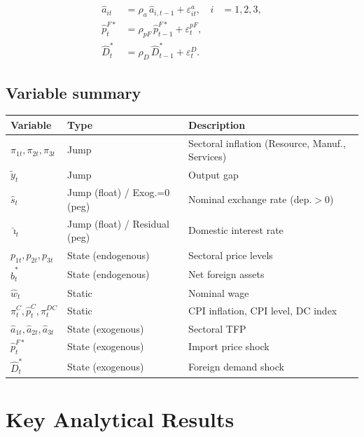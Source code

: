 \documentclass[11pt,a4paper]{article}
\newcommand{\wh}[1]{\widehat{#1}}
\providecommand{\tl}[1]{\widetilde{#1}}
\newcommand{\DC}{\pi^{DC}}
\begin{document}
\begin{align}
\wh a_{it}&=\rho_a\,\wh a_{i,t-1}+\varepsilon^a_{it},&i&=1,2,3,\label{eq:TFP}\\
\wh p^{F*}_t&=\rho_{pF}\,\wh p^{F*}_{t-1}+\varepsilon^{pF}_t,\label{eq:impPrice}\\
\wh D^*_t&=\rho_D\,\wh D^*_{t-1}+\varepsilon^D_t.\label{eq:demand}
\end{align}

\subsection{Variable summary}

\begin{center}
\begin{tabular}{lll}
\toprule
\textbf{Variable} & \textbf{Type} & \textbf{Description}\\
\midrule
$\pi_{1t},\pi_{2t},\pi_{3t}$ & Jump & Sectoral inflation (Resource, Manuf., Services)\\
$\tl y_t$ & Jump & Output gap\\
$\wh s_t$ & Jump (float) / Exog.=0 (peg) & Nominal exchange rate (dep.$>$0)\\
$\wh\imath_t$ & Jump (float) / Residual (peg) & Domestic interest rate\\
$p_{1t},p_{2t},p_{3t}$ & State (endogenous) & Sectoral price levels\\
$\wh b^*_t$ & State (endogenous) & Net foreign assets\\
$\wh w_t$ & Static & Nominal wage\\
$\pi^C_t,\wh p^C_t,\DC_t$ & Static & CPI inflation, CPI level, DC index\\
$\wh a_{1t},\wh a_{2t},\wh a_{3t}$ & State (exogenous) & Sectoral TFP\\
$\wh p^{F*}_t$ & State (exogenous) & Import price shock\\
$\wh D^*_t$ & State (exogenous) & Foreign demand shock\\
\bottomrule
\end{tabular}
\end{center}

\section{Key Analytical Results}
\end{document}
